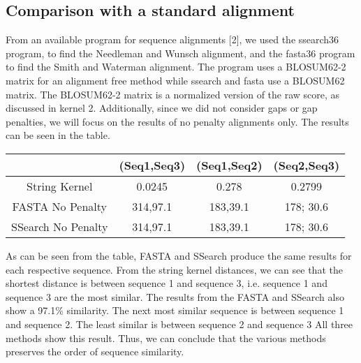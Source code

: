 \documentclass{article}
\begin{document}
\subsection{Comparison with a standard alignment}
From an available program for sequence alignments [2], we used the ssearch36 program, to find the Needleman and Wunsch alignment, and the fasta36 program to find the Smith and Waterman alignment. The program uses a BLOSUM62-2 matrix for an alignment free method while ssearch and fasta use a BLOSUM62 matrix. The BLOSUM62-2 matrix is a normalized version of the raw score, as discussed in kernel 2. Additionally, since we did not consider gaps or gap penalties, we will focus on the results of no penalty alignments only. The results can be seen in the table. 
\begin{center}
\begin{tabular}{ |c|c|c|c|} \hline
                    & (Seq1,Seq3)    &(Seq1,Seq2)  &(Seq2,Seq3) \\ \hline
String Kernel       &0.0245         &0.278        &0.2799        \\ \hline
FASTA No Penalty    &314,97.1       &183,39.1        &178; 30.6   \\ \hline
SSearch No Penalty  &314,97.1       &183,39.1       &178; 30.6   \\ \hline
\end{tabular}
\end{center}
As can be seen from the table, FASTA and SSearch produce the same results for each respective sequence. From the string kernel distances, we can see that the shortest distance is between sequence 1 and sequence 3, i.e. sequence 1 and sequence 3 are the most similar. The results from the FASTA and SSearch also show a 97.1\% similarity. The next  most similar sequence is between sequence 1 and sequence 2. The least similar is between sequence 2 and sequence 3 All three methods show this result. Thus, we can conclude that the various methods preserves the order of sequence similarity. 
\end{document}
